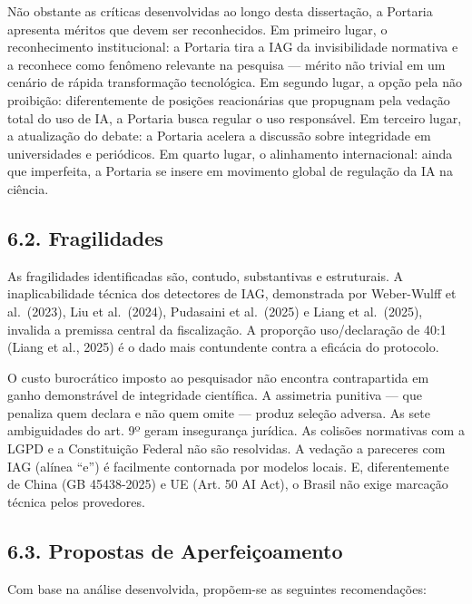 \documentclass[
  12pt,
  a4paper,
  brazil,
  twoside
]{report}
\begin{document}
Não obstante as críticas desenvolvidas ao longo desta dissertação, a
Portaria apresenta méritos que devem ser reconhecidos. Em primeiro
lugar, o reconhecimento institucional: a Portaria tira a IAG da
invisibilidade normativa e a reconhece como fenômeno relevante na
pesquisa --- mérito não trivial em um cenário de rápida transformação
tecnológica. Em segundo lugar, a opção pela não proibição:
diferentemente de posições reacionárias que propugnam pela vedação total
do uso de IA, a Portaria busca regular o uso responsável. Em terceiro
lugar, a atualização do debate: a Portaria acelera a discussão sobre
integridade em universidades e periódicos. Em quarto lugar, o
alinhamento internacional: ainda que imperfeita, a Portaria se insere em
movimento global de regulação da IA na ciência.

\subsection{6.2. Fragilidades}\label{fragilidades}

As fragilidades identificadas são, contudo, substantivas e estruturais.
A inaplicabilidade técnica dos detectores de IAG, demonstrada por
Weber-Wulff et al.~(2023), Liu et al.~(2024), Pudasaini et al.~(2025) e
Liang et al.~(2025), invalida a premissa central da fiscalização. A
proporção uso/declaração de 40:1 (Liang et al., 2025) é o dado mais
contundente contra a eficácia do protocolo.

O custo burocrático imposto ao pesquisador não encontra contrapartida em
ganho demonstrável de integridade científica. A assimetria punitiva ---
que penaliza quem declara e não quem omite --- produz seleção adversa.
As sete ambiguidades do art. 9º geram insegurança jurídica. As colisões
normativas com a LGPD e a Constituição Federal não são resolvidas. A
vedação a pareceres com IAG (alínea ``e'') é facilmente contornada por
modelos locais. E, diferentemente de China (GB 45438-2025) e UE (Art. 50
AI Act), o Brasil não exige marcação técnica pelos provedores.

\subsection{6.3. Propostas de
Aperfeiçoamento}\label{propostas-de-aperfeiuxe7oamento}

Com base na análise desenvolvida, propõem-se as seguintes recomendações:
\end{document}

